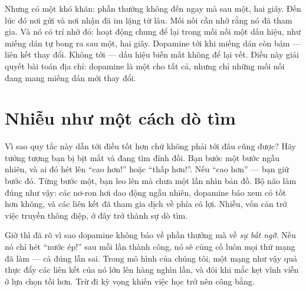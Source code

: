 Nhưng có một khó khăn: phần thưởng không đến ngay mà sau một, hai giây. Đến lúc đó nơi gửi và nơi nhận đã im lặng từ lâu. Mối nối cần nhớ rằng nó đã tham gia. Và nó có trí nhớ đó: hoạt động chung để lại trong mối nối một dấu hiệu, như miếng dán tự bong ra sau một, hai giây. Dopamine tới khi miếng dán còn bám --- liên kết thay đổi. Không tới --- dấu hiệu biến mất không để lại vết. Điều này giải quyết bài toán địa chỉ: dopamine là một cho tất cả, nhưng chỉ những mối nối đang mang miếng dán mới thay đổi.


\section*{Nhiễu như một cách dò tìm}

Vì sao quy tắc này dẫn tới điều tốt hơn chứ không phải tới đâu cũng được? Hãy tưởng tượng bạn bị bịt mắt và đang tìm đỉnh đồi. Bạn bước một bước ngẫu nhiên, và ai đó hét lên ``cao hơn!'' hoặc ``thấp hơn!''. Nếu ``cao hơn'' --- bạn giữ bước đó. Từng bước một, bạn leo lên mà chưa một lần nhìn bản đồ. Bộ não làm đúng như vậy: các nơ-ron hơi dao động ngẫu nhiên, dopamine báo xem có tốt hơn không, và các liên kết đã tham gia dịch về phía có lợi. Nhiễu, vốn cản trở việc truyền thông điệp, ở đây trở thành sự dò tìm.

Giờ thì đã rõ vì sao dopamine không báo về phần thưởng mà về \emph{sự bất ngờ}. Nếu nó chỉ hét ``nước ép!'' sau mỗi lần thành công, nó sẽ củng cố luôn mọi thứ mạng đã làm --- cả đúng lẫn sai. Trong mô hình của chúng tôi, một mạng như vậy quả thực đẩy các liên kết của nó lớn lên hàng nghìn lần, và đôi khi mắc kẹt vĩnh viễn ở lựa chọn tồi hơn. Trừ đi kỳ vọng khiến việc học trở nên công bằng.

